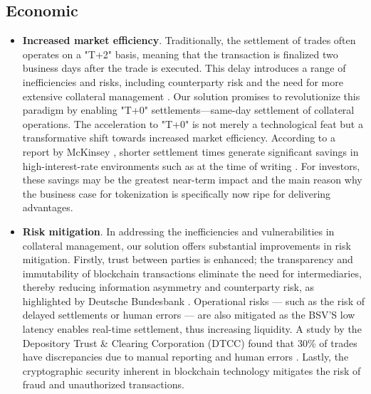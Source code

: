 \subsection{Economic}
\label{subsec:benefits_economic}

\begin{itemize}
    \item \textbf{Increased market efficiency}. Traditionally, the settlement of trades often operates on a "T+2" basis, meaning that the transaction is finalized two business days after the trade is executed. This delay introduces a range of inefficiencies and risks, including counterparty risk and the need for more extensive collateral management \citep{t_2_settlements}. Our solution promises to revolutionize this paradigm by enabling "T+0" settlements—same-day settlement of collateral operations. The acceleration to "T+0" is not merely a technological feat but a transformative shift towards increased market efficiency. According to a report by McKinsey \citep{mckisney_tokenization}, shorter settlement times generate significant savings in high-interest-rate environments such as at the time of writing \citep{BoE_rates}. For investors, these savings may be the greatest near-term impact and the main reason why the business case for tokenization is specifically now ripe for delivering advantages.
    

    \item \textbf{Risk mitigation}. In addressing the inefficiencies and vulnerabilities in collateral management, our solution offers substantial improvements in risk mitigation. Firstly, trust between parties is enhanced; the transparency and immutability of blockchain transactions eliminate the need for intermediaries, thereby reducing information asymmetry and counterparty risk, as highlighted by Deutsche Bundesbank \citep{Deutsche_Bundesbank}. Operational risks — such as the risk of delayed settlements or human errors  — are also mitigated as the BSV'S low latency enables real-time settlement, thus increasing liquidity. A study by the Depository Trust \& Clearing Corporation (DTCC) found that 30\% of trades have discrepancies due to manual reporting and human errors \citep{DTCC}. Lastly, the cryptographic security inherent in blockchain technology mitigates the risk of fraud and unauthorized transactions.
\end{itemize}
